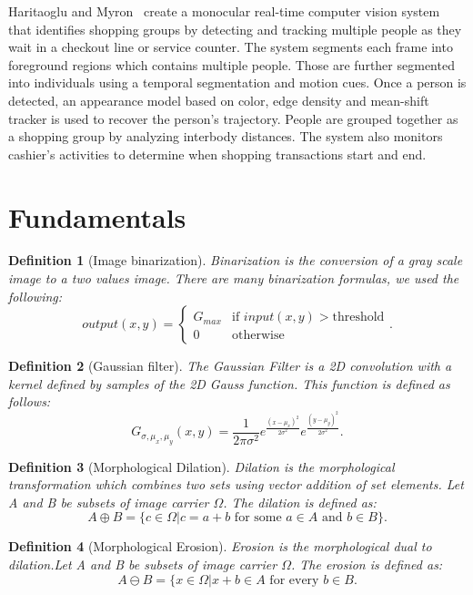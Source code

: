 \documentclass[10pt, conference]{IEEEtran}
\newtheorem{definition}{Definition}
\begin{document}
	Haritaoglu and Myron~\cite{haritaoglu2001detection} create a monocular real-time computer vision system that identifies shopping groups by detecting and tracking multiple people as they wait in a checkout line or service counter. The system segments each frame into foreground regions which contains multiple people. Those are further segmented into individuals using a temporal segmentation and motion cues. Once a person is detected, an appearance model based on color, edge density and mean-shift tracker is used to recover the person’s trajectory. People are grouped together as a shopping group by analyzing interbody distances. The system also monitors cashier’s activities to determine when shopping transactions start and end.
	
	\section{Fundamentals}
	\begin{definition}[Image binarization]
		Binarization is the conversion of a gray scale image to a two values image. There are many binarization formulas, we used the following:
		\[
		output(x,y) =
		\begin{cases}
		G_{max} & \text{if } input(x,y) > \text{threshold}\\
		0 & \text{otherwise}
		\end{cases}.
		\]
	\end{definition}
	\begin{definition}[Gaussian filter]
		The Gaussian Filter is a 2D convolution with a kernel defined by samples of the 2D Gauss function. This function is defined as follows:
		$$ G_{\sigma,\mu_{x},\mu_{y}}(x,y)=\frac{1}{2\pi\sigma^{2}}
		e^{\frac{(x-\mu_{x})^{2}}{2\sigma^{2}}}
		e^{\frac{(y-\mu_{y})^{2}}{2\sigma^{2}}}.$$
		
	\end{definition}
	\begin{definition}[Morphological Dilation]
		Dilation is the morphological transformation which combines two sets using vector addition of set elements. Let A and B be subsets of image carrier $\Omega$. The dilation is defined as: $$A \oplus B=\{c\in\Omega|c=a+b \text{ for some }a\in A\text{  and }b \in B\}.$$
	\end{definition}
	
	\begin{definition}[Morphological Erosion]
		Erosion is the morphological dual to dilation.Let A and B be subsets of image carrier $\Omega$. The erosion is defined as: $$A \ominus B=\{x\in\Omega | x+b \in A \text{ for every }b\in B.$$
	\end{definition}
	
\end{document}
